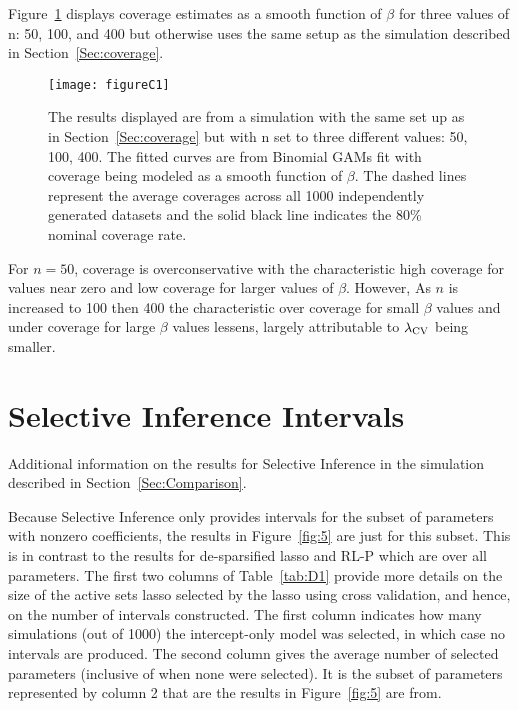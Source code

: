 Figure~\ref{fig:C1} displays coverage estimates as a smooth function of $\beta$ for three values of n: 50, 100, and 400 but otherwise uses the same setup as the simulation described in Section~\ref{Sec:coverage}.

\begin{figure}[hbtp]
  \begin{center}
  \texttt{[image: figureC1]}
  \caption{\label{fig:C1} The results displayed are from a simulation with the same set up as in Section~\ref{Sec:coverage} but with n set to three different values: 50, 100, 400. The fitted curves are from Binomial GAMs fit with coverage being modeled as a smooth function of $\beta$. The dashed lines represent the average coverages across all 1000 independently generated datasets and the solid black line indicates the 80\% nominal coverage rate.}
  \end{center}
\end{figure}

For $n = 50$, coverage is overconservative with the characteristic high coverage for values near zero and low coverage for larger values of $\beta$. However, As $n$ is increased to 100 then 400 the characteristic over coverage for small $\beta$ values and under coverage for large $\beta$ values lessens, largely attributable to $\lambda_{\textrm{CV}}$ being smaller.

\clearpage

\section{Selective Inference Intervals}\label{Sup:si_int_info}


\begin{table}[hb]
  \singlespace
  \centering
  
  \caption{Additional information on the results for Selective Inference in the simulation described in Section~\ref{Sec:Comparison}.}
  \label{tab:D1}
\end{table}


Because Selective Inference only provides intervals for the subset of parameters with nonzero coefficients, the results in Figure~\ref{fig:5} are just for this subset. This is in contrast to the results for de-sparsified lasso and RL-P which are over all parameters. The first two columns of Table~\ref{tab:D1} provide more details on the size of the active sets lasso selected by the lasso using cross validation, and hence, on the number of intervals constructed. The first column indicates how many simulations (out of 1000) the intercept-only model was selected, in which case no intervals are produced. The second column gives the average number of selected parameters (inclusive of when none were selected). It is the subset of parameters represented by column 2 that are the results in Figure~\ref{fig:5} are from.


